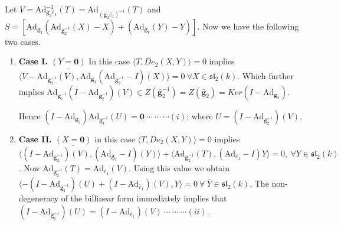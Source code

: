 \documentclass[10pt,twoside]{amsart}
\theoremstyle{definition}
\theoremstyle{definition}
\begin{document}
    Let $V=\mathrm{Ad}_{\mathbf{\bar g}_2\bar e_1}^{-1}(T)=\mathrm{Ad}_{(\mathbf{\bar g}_2\bar e_1)^{-1}}(T)$ and $S=[\mathrm{Ad}_{\mathbf{\bar g}_1}(\mathrm{Ad}_{\mathbf{\bar g}_2^{-1}}(X)-X)+(\mathrm{Ad}_{\mathbf{\bar g}_1}(Y)-Y)]$. Now we have the following two cases.

    \begin{enumerate}
    \item \textbf{Case I. $\underline {(Y=\mathbf{0})}$} In this case $\langle T, \overline{De}_2(X,Y)\rangle=0$ implies $\langle V-\mathrm{Ad}_{\mathbf{\bar g}_2^{-1}}(V),\mathrm{Ad}_{\mathbf{\bar g}_1}(\mathrm{Ad}_{\mathbf{\bar g}_2^{-1}}-I)(X)\rangle=0 \ \forall X\in \mathfrak{sl}_2(k)$. Which further implies $\mathrm{Ad}_{\mathbf{\bar g}_1^{-1}}(I-\mathrm{Ad}_{\mathbf{\bar g}_2^{-1}})(V)\in Z(\mathbf{\bar g}_2^{-1})=Z(\mathbf{\bar g}_2)=Ker (I-\mathrm{Ad}_{\mathbf{\bar g}_2})$. 
    
    \noindent Hence $\boxed{(I-\mathrm{Ad}_{\mathbf{\bar g}_2})\mathrm{Ad}_{\mathbf{\bar g}_1^{-1}}(U)=\mathbf{0}}\ \cdots \ \cdots\  \cdots (i)$; where $U=(I-\mathrm{Ad}_{\mathbf{\bar g}_2^{-1}})(V)$.  
        \item \textbf{Case II. $\underline {(X=\mathbf{0})}$} in  this case $\langle T,\overline{De}_2(X,Y)\rangle=0$ implies $\langle (I-\mathrm{Ad}_{\mathbf{\bar g}_2^{-1}})(V), (\mathrm{Ad}_{\mathbf{\bar g}_1}-I)(Y)\rangle+\langle \mathrm{Ad}_{\mathbf{\bar g}_2^{-1}}(T),(\mathrm{Ad}_{\bar e_1}-I)Y\rangle=0 ,\ \forall Y\in \mathfrak{sl}_2(k) $. Now $\mathrm{Ad}_{\mathbf{\bar g}_2^{-1}}(T)=\mathrm{Ad}_{\bar e_1}(V)$. Using this value we obtain $\langle -(I-\mathrm{Ad}_{\mathbf{\bar g}_1^{-1}})(U)+(I-\mathrm{Ad}_{\bar e_1})(V),Y\rangle=0\ \forall \  \bar Y\in \mathfrak{sl}_2(k) $. The non-degeneracy of the billinear form immediately implies that $\boxed{(I-\mathrm{Ad}_{\mathbf{\bar g}_1^{-1}})(U)=(I-\mathrm{Ad}_{\bar e_1})(V)} \ \cdots \ \cdots\ \cdots (ii)$. 
    \end{enumerate}
\end{document}
